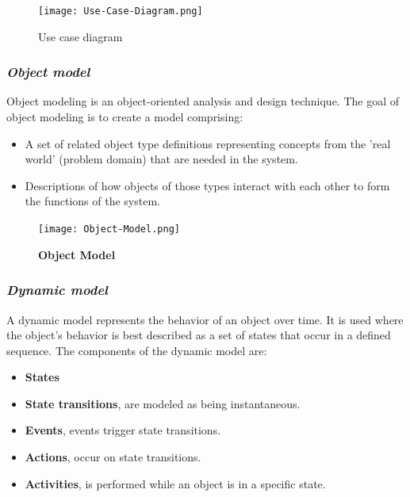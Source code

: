 \documentclass[a4paper]{article}
\begin{document}
\FloatBarrier

\begin{figure}[h!]
\caption*{Use case diagram}
\label{UCDiag1}
\centering
\texttt{[image: Use-Case-Diagram.png]}
\end{figure}

\FloatBarrier

\subsubsection{\textit{Object model}}

Object modeling is an object-oriented analysis and design technique. The goal of object modeling is to create a model comprising:

\begin{itemize}
\item A set of related object type definitions representing concepts from the 'real world' (problem domain) that are needed in the system.
\item Descriptions of how objects of those types interact with each other to form the functions of the system.
\end{itemize}

\FloatBarrier

\begin{figure}[h!]
\caption*{\textbf{Object Model}}
\label{ObjMdl}
\centering 
\texttt{[image: Object-Model.png]}
\end{figure}

\FloatBarrier

\subsubsection{\textit{Dynamic model}}

A dynamic model represents the behavior of an object over time. It is used where the object's behavior is best described as a set of states that occur in a defined sequence. The components of the dynamic model are:

\begin{itemize}
\item \textbf{States} 
\item \textbf{State transitions}, are modeled as being instantaneous.
\item \textbf{Events}, events trigger state transitions.
\item \textbf{Actions}, occur on state transitions.
\item \textbf{Activities}, is performed while an object is in a specific state.
\end{itemize}
\end{document}
